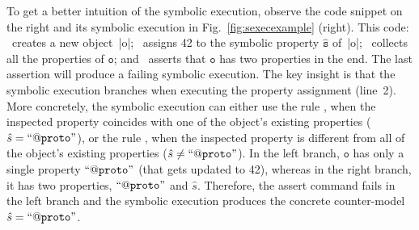 To get a better intuition of the symbolic execution, observe the code snippet on the right and its symbolic execution in Fig.~\ref{fig:sexecexample} (right). 
This code: 
        ~creates a new object~\jsinline|o|;
	~assigns 42 to the symbolic property $\hat{\mathtt{s}}$ of~\jsinline|o|; 
	~collects all the properties of $\mathtt{o}$; and
	~asserts that $\mathtt{o}$ has two properties in the end. 
	     The last assertion will produce a failing symbolic execution.
%
%
The key insight is that the symbolic execution branches when executing the property assignment (line~2).
% 
More concretely, the symbolic execution can either use the rule , when 
the inspected property coincides with one of the object's existing properties ({\small$\hat{s} = \mathtt{``@proto"}$}), 
or the rule , when the inspected property is different from all of the 
object's existing properties ({\small $\hat{s} \neq \mathtt{``@proto"}$}). 
%
In the left branch, $\mathtt{o}$ has only a single property {\small$\mathtt{``@proto"}$} (that gets updated to 42), whereas
in the right branch, it has two properties, {\small$\mathtt{``@proto"}$} and $\hat{s}$. 
%
Therefore, the assert command fails in the left branch and the symbolic execution  produces the concrete counter-model 
{\small$\hat{s} = \mathtt{``@proto"}$}.

